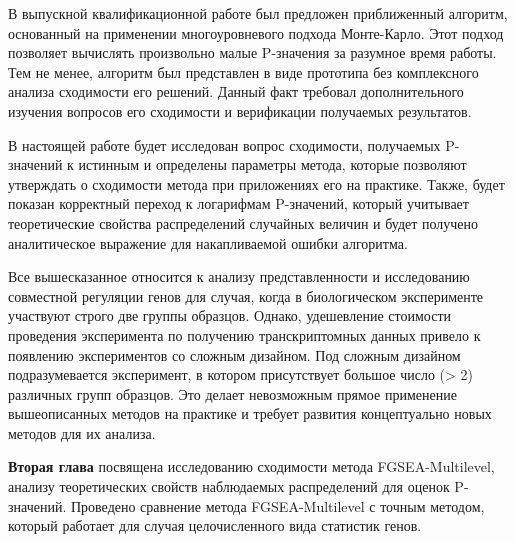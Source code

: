 В выпускной квалификационной работе \fixme{\cite{}} был предложен приближенный алгоритм, основанный на применении многоуровневого подхода Монте-Карло.
Этот подход позволяет вычислять произвольно малые P-значения за разумное время работы.
Тем не менее, алгоритм был представлен в виде прототипа без комплексного анализа сходимости его решений.
Данный факт требовал дополнительного изучения вопросов его сходимости и верификации получаемых результатов.

В настоящей работе будет исследован вопрос сходимости, получаемых P-значений к истинным и определены параметры метода, которые позволяют утверждать о сходимости метода при приложениях его на практике.
Также, будет показан корректный переход к логарифмам P-значений, который учитывает теоретические свойства распределений случайных величин и будет получено аналитическое выражение для накапливаемой ошибки алгоритма.

Все вышесказанное относится к анализу представленности и исследованию совместной регуляции генов для случая, когда в биологическом эксперименте участвуют строго две группы образцов.
Однако, удешевление стоимости проведения эксперимента по получению транскриптомных данных привело к появлению экспериментов со сложным дизайном.
Под сложным дизайном подразумевается эксперимент, в котором присутствует  большое число (> 2) различных групп образцов.
Это делает невозможным прямое применение вышеописанных методов на практике и требует развития концептуально новых методов для их анализа.





\textbf{Вторая глава} посвящена исследованию сходимости метода FGSEA-Multilevel, анализу теоретических свойств наблюдаемых распределений для оценок P-значений.
Проведено сравнение метода FGSEA-Multilevel с точным методом, который работает для случая целочисленного вида статистик генов.

